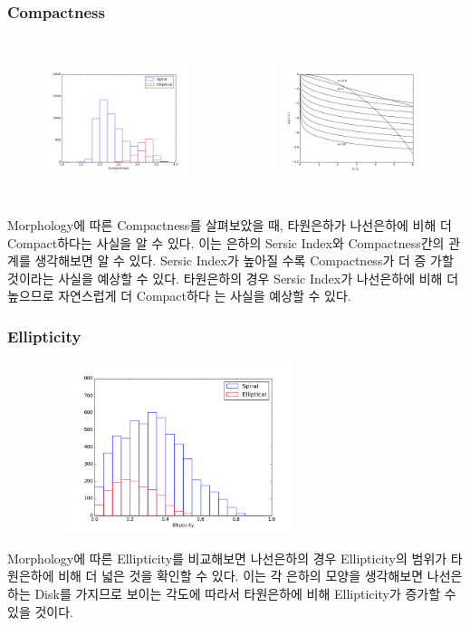 \documentclass[xcolor={dvipsnames,table}]{beamer}
\newcommand\SM{\fontsize{8}{7.2}\selectfont}
\begin{document}
\begin{frame}
 \frametitle{Compactness}
 \SM
 \begin{columns}[t]
   \begin{figure}
    \centering
    \includegraphics[width=6cm, height=4cm]{compact.png}
   \end{figure}
   \begin{figure}
    \centering
    \includegraphics[width=6cm, height=4cm]{sersic.png}
   \end{figure}
  \end{columns}
\vspace{0.3cm}
Morphology에 따른 Compactness를 살펴보았을 때, 타원은하가 나선은하에 비해 더 Compact하다는 사실을 알 수 있다. 이는
은하의 Sersic Index와 Compactness간의 관계를 생각해보면 알 수 있다. Sersic Index가 높아질 수록 Compactness가 더 증
가할 것이라는 사실을 예상할 수 있다. 타원은하의 경우 Sersic Index가 나선은하에 비해 더 높으므로 자연스럽게 더 Compact하다
는 사실을 예상할 수 있다.

 
\end{frame}

\begin{frame}
 \frametitle{Ellipticity}
 \SM
 \begin{figure}
   \centering
    \includegraphics[width=8cm, height=5cm]{ellip.png}
 \end{figure}

Morphology에 따른 Ellipticity를 비교해보면 나선은하의 경우 Ellipticity의 범위가 타원은하에 비해 더 넓은 것을 확인할 수 있다.
이는 각 은하의 모양을 생각해보면 나선은하는 Disk를 가지므로 보이는 각도에 따라서 타원은하에 비해 Ellipticity가 증가할 수 있을
것이다.
 
\end{frame}
\end{document}

